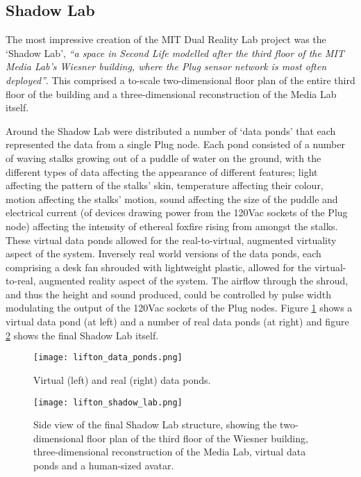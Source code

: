 \subsection{Shadow Lab}
\label{subsec:mit_shadow_lab}
The most impressive creation of the MIT Dual Reality Lab project was the `Shadow Lab', \textit{``a space in Second Life modelled after the third floor of the MIT Media Lab's Wiesner building, where the Plug sensor network is most often deployed''}. This comprised a to-scale two-dimensional floor plan of the entire third floor of the building and a three-dimensional reconstruction of the Media Lab itself.

Around the Shadow Lab were distributed a number of `data ponds' that each represented the data from a single Plug node. Each pond consisted of a number of waving stalks growing out of a puddle of water on the ground, with the different types of data affecting the appearance of different features; light affecting the pattern of the stalks' skin, temperature affecting their colour, motion affecting the stalks' motion, sound affecting the size of the puddle and electrical current (of devices drawing power from the 120Vac sockets of the Plug node) affecting the intensity of ethereal foxfire rising from amongst the stalks. These virtual data ponds allowed for the real-to-virtual, augmented virtuality aspect of the system. Inversely real world versions of the data ponds, each comprising a desk fan shrouded with lightweight plastic, allowed for the virtual-to-real, augmented reality aspect of the system. The airflow through the shroud, and thus the height and sound produced, could be controlled by pulse width modulating the output of the 120Vac sockets of the Plug nodes. Figure \ref{lifton_data_ponds.png} shows a virtual data pond (at left) and a number of real data ponds (at right) and figure \ref{lifton_shadow_lab.png} shows the final Shadow Lab itself.

\begin{figure}[h]
\centering
\texttt{[image: lifton\_data\_ponds.png]}
\caption{Virtual (left) and real (right) data ponds.}
\label{lifton_data_ponds.png}
\end{figure}

\begin{figure}[h]
\centering
\texttt{[image: lifton\_shadow\_lab.png]}
\caption{Side view of the final Shadow Lab structure, showing the two-dimensional floor plan of the third floor of the Wiesner building, three-dimensional reconstruction of the Media Lab, virtual data ponds and a human-sized avatar.}
\label{lifton_shadow_lab.png}
\end{figure}

